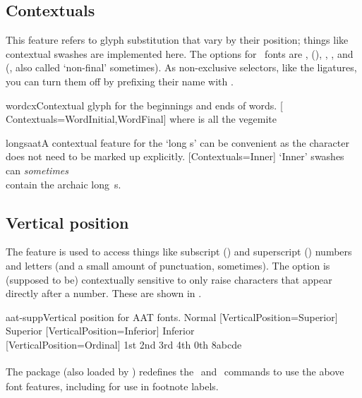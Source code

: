 \subsection{Contextuals} \label{sec:contextuals}
This feature refers to glyph substitution that vary by their position;
things like contextual swashes are implemented here.
The options for \AAT\ fonts are
,  (), ,
, and  (, also called `non-final' sometimes). As
non-exclusive selectors, like the ligatures, you can turn them off
by prefixing their name with .

\begin{Xexample}{wordcx}{Contextual glyph for the beginnings and ends of words.}
  \newfontface{}[%
    Contextuals={WordInitial,WordFinal}]
  \fancy where is all the vegemite
\end{Xexample}

\begin{Xexample}{longsaat}{A contextual feature for the `long s' can be convenient as the character does not need to be marked up explicitly.}
  [Contextuals=Inner]
  `Inner' swashes can \emph{sometimes}    \\
   contain the archaic long~s.
\end{Xexample}



\subsection{Vertical position}
The  feature is used to access things like
subscript () and superscript () numbers and
letters (and a small amount of punctuation, sometimes).
The  option is (supposed to be)
contextually sensitive to only raise characters that appear directly
after a number.
These are shown in .

\begin{Xexample}{aat-supp}{Vertical position for AAT fonts.}
   Normal
  [VerticalPosition=Superior]
   Superior
  [VerticalPosition=Inferior]
   Inferior                \\
  [VerticalPosition=Ordinal]
   1st 2nd 3rd 4th 0th 8abcde
\end{Xexample}

The  package
(also loaded by )
redefines the \cmd\textsubscript\ and
\cmd\textsuperscript\ commands to use the above font features,
including for use in footnote labels.

